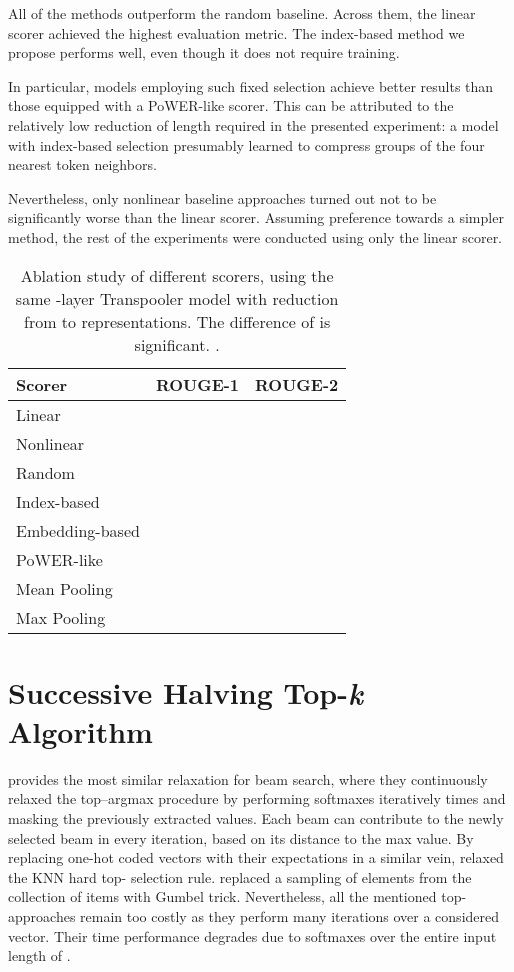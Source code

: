 \documentclass{article}
\begin{document}
All of the methods outperform the random baseline. Across them, the linear scorer achieved the highest evaluation metric. The index-based method we propose performs well, even though it does not require training.

In particular, models employing such fixed selection achieve better results than those equipped with a PoWER-like scorer. This can be attributed to the relatively low reduction of length required in the presented experiment: a model with index-based selection presumably learned to compress groups of the four nearest token neighbors.

Nevertheless, only nonlinear baseline approaches turned out not to be significantly worse than the linear scorer. Assuming preference towards a simpler method, the rest of the experiments were conducted using only the linear scorer.

\begin{table}[h]
\caption{Ablation study of different scorers, using the same -layer Transpooler model with reduction from  to  representations. 
The difference of  is significant. \citep{doi:10.1113/jphysiol.2012.239376}.}

\label{tab:scorer}
\centering
\begin{tabular}{lcc}
\toprule
Scorer & ROUGE-1 & ROUGE-2 \\ \midrule
Linear     &   &  \\
Nonlinear       &  &  \\        Random         &   &  \\        Index-based          &  &  \\
Embedding-based &   &  \\
PoWER-like &   &   \\

Mean Pooling &   &   \\

Max Pooling &   &   \\

\bottomrule
\end{tabular}
\end{table}


\section{Successive Halving Top-\textit{k} Algorithm}\label{appendix_topk}
\citet{goyal2017continuous} provides the most similar relaxation for beam search, where they continuously relaxed the top--argmax procedure by performing softmaxes iteratively  times and masking the previously extracted values. Each beam can contribute to the newly selected beam in every iteration, based on its distance to the max value.
By replacing one-hot coded vectors with their expectations in a similar vein, \citet{pltz2018neural} relaxed the KNN hard top- selection rule. 
\citet{xie2019reparameterizable} replaced a sampling of  elements from the collection of items with Gumbel trick. 
Nevertheless, all the mentioned top- approaches remain too costly as they perform many iterations over a considered vector. Their time performance degrades due to  softmaxes over the entire input length of .
\end{document}
